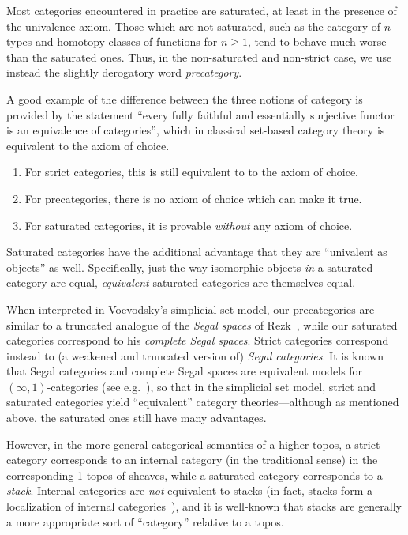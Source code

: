 \documentclass{amsart}
\theoremstyle{definition}
\theoremstyle{remark}
\numberwithin{equation}{section}
\begin{document}
Most categories encountered in practice are saturated, at least in the presence of the univalence axiom.
Those which are not saturated, such as the category of $n$-types and homotopy classes of functions for $n\ge 1$, tend to behave much worse than the saturated ones.
Thus, in the non-saturated and non-strict case, we use instead the slightly derogatory word \emph{precategory}.

A good example of the difference between the three notions of category is provided by the statement ``every fully faithful and essentially surjective functor is an equivalence of categories'', which in classical set-based category theory is equivalent to the axiom of choice.
\begin{enumerate}
\item For strict categories, this is still equivalent to to the axiom of choice.
\item For precategories, there is no axiom of choice which can make it true.
\item For saturated categories, it is provable \emph{without} any axiom of choice.\label{item:satnoac}
\end{enumerate}
Saturated categories have the additional advantage that they are ``univalent as objects'' as well.
Specifically, just the way isomorphic objects \emph{in} a saturated category are equal, \emph{equivalent} saturated categories are themselves equal.

When interpreted in Voevodsky's simplicial set model, our precategories are similar to a truncated analogue of the \emph{Segal spaces} of Rezk~\cite[Sec.~14]{rezk01css}, while our saturated categories correspond to his \emph{complete Segal spaces}.
Strict categories correspond instead to (a weakened and truncated version of) \emph{Segal categories}.
It is known that Segal categories and complete Segal spaces are equivalent models for $(\infty,1)$-categories (see e.g.~\cite{bergner:infty-one}), so that in the simplicial set model, strict and saturated categories yield ``equivalent'' category theories---although as mentioned above, the saturated ones still have many advantages.

However, in the more general categorical semantics of a higher topos, a strict category corresponds to an internal category (in the traditional sense) in the corresponding 1-topos of sheaves, while a saturated category corresponds to a \emph{stack}.
Internal categories are \emph{not} equivalent to stacks (in fact, stacks form a localization of internal categories~\cite{jt:strong-stacks}), and it is well-known that stacks are generally a more appropriate sort of ``category'' relative to a topos.
\end{document}
